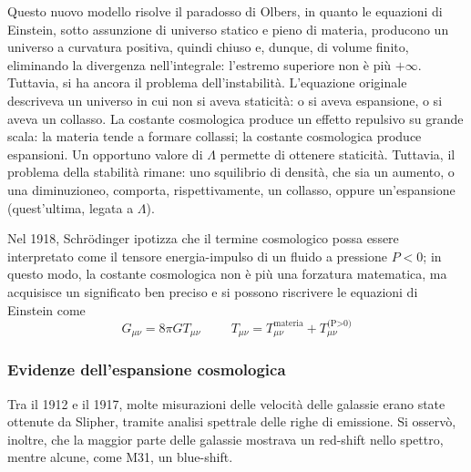 \documentclass[11pt, a4paper]{scrartcl}
\theoremstyle{style}
\theoremstyle{style1}
\numberwithin{equation}{subsection}
\begin{document}
Questo nuovo modello risolve il paradosso di Olbers, in quanto le equazioni di Einstein, sotto assunzione di universo statico e pieno di materia, producono un universo a curvatura positiva, quindi chiuso e, dunque, di volume finito, eliminando la divergenza nell'integrale: l'estremo superiore non \`e pi\`u $+\infty$.
Tuttavia, si ha ancora il problema dell'instabilit\`a.
L'equazione originale descriveva un universo in cui non si aveva staticit\`a: o si aveva espansione, o si aveva un collasso.
La costante cosmologica produce un effetto repulsivo su grande scala: la materia tende a formare collassi; la costante cosmologica produce espansioni.
Un opportuno valore di $\Lambda $ permette di ottenere staticit\`a.
Tuttavia, il problema della stabilit\`a rimane: uno squilibrio di densit\`a, che sia un aumento, o una diminuzioneo, comporta, rispettivamente, un collasso, oppure un'espansione (quest'ultima, legata a $\Lambda $).

Nel 1918, Schr\"odinger ipotizza che il termine cosmologico possa essere interpretato come il tensore energia-impulso di un fluido a pressione $P < 0$; in questo modo, la costante cosmologica non \`e pi\`u una forzatura matematica, ma acquisisce un significato ben preciso e si possono riscrivere le equazioni di Einstein come
\[
	G_{\mu  \nu  }  = 8 \pi G T_{\mu  \nu  }  \hspace{1cm} T_{\mu \nu }  = T_{\mu \nu } ^\text{materia} + T_{\mu \nu }^\text{(P>0)}
\] 
\subsubsection{Evidenze dell'espansione cosmologica}
Tra il 1912 e il 1917, molte misurazioni delle velocit\`a delle galassie erano state ottenute da Slipher, tramite analisi spettrale delle righe di emissione.
Si osserv\`o, inoltre, che la maggior parte delle galassie mostrava un red-shift nello spettro, mentre alcune, come M31, un blue-shift.
\end{document}
